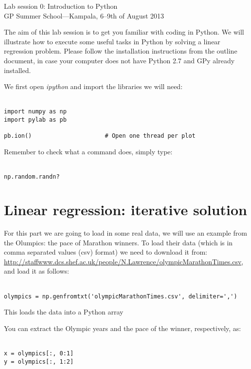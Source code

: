 \documentclass{article}
\begin{document}
\begin{center}
\textcolor{MyDarkBlue}{
{\LARGE Lab session 0: Introduction to Python\\}
\vspace*{.5cm}
{\large GP Summer School---Kampala, 6--9th of August 2013}
}
\end{center}
\vspace*{1cm}

The aim of this lab session is to get you familiar with coding in
Python.  We will illustrate how to execute some useful tasks in Python
by solving a linear regression problem. Please follow the installation
instructions from the outline document, in case your computer does not
have Python 2.7 and GPy already installed.


 We first open \textit{ipython} and import the libraries we will need: \\ \ \\
\begin{verbatim}
import numpy as np
import pylab as pb

pb.ion()                     # Open one thread per plot
\end{verbatim}


Remember to check what a command does, simply type: \\ \ \\
\begin{verbatim}
np.random.randn?
\end{verbatim}


\section{Linear regression: iterative solution}


For this part we are going to load in some real data, we will use an example from the Olumpics: the pace of Marathon winners. To load
their data (which is in comma separated values (csv) format) we need to 
 download it from:
\url{http://staffwww.dcs.shef.ac.uk/people/N.Lawrence/olympicMarathonTimes.csv}, and load it
as follows:\\ \ \\
\begin{verbatim}
olympics = np.genfromtxt('olympicMarathonTimes.csv', delimiter=',')
\end{verbatim}

This loads the data into a Python array

You can extract the Olympic years and the pace of the winner, respectively, as:
\\ \ \\
\begin{verbatim}
x = olympics[:, 0:1]
y = olympics[:, 1:2]
\end{verbatim}
\end{document}
